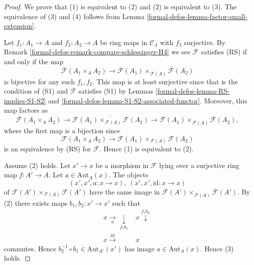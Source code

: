 \begin{proof}
We prove that (1) is equivalent to (2) and (2) is equivalent to (3).  The
equivalence of (3) and (4) follows from Lemma
\ref{formal-defos-lemma-factor-small-extension}.

\medskip\noindent
Let $f_1: A_1 \to A$ and $f_2: A_2 \to A$ be ring maps in
$\mathcal{C}_\Lambda$ with $f_2$ surjective. By
Remark \ref{formal-defos-remark-compare-schlessinger-H4}
we see $\overline{\mathcal{F}}$ satisfies (RS) if and
only if the map
$$
\overline{\mathcal{F}}(A_1 \times_A A_2) \to \overline{\mathcal
F}(A_1) \times_{\overline{\mathcal{F}}(A)} \overline{\mathcal{F}}(A_2)
$$
is bijective for any such $f_1, f_2$.
This map is at least surjective since that
is the condition of (S1) and $\overline{\mathcal{F}}$ satisfies (S1) by
Lemmas \ref{formal-defos-lemma-RS-implies-S1-S2} and
\ref{formal-defos-lemma-S1-S2-associated-functor}.
Moreover, this map factors as
$$
\overline{\mathcal{F}}(A_1 \times_A A_2)
\longrightarrow
\overline{\mathcal{F}(A_1) \times_{\mathcal{F}(A)} \mathcal{F}(A_2)}
\longrightarrow
\overline{\mathcal{F}}(A_1) \times_{\overline{\mathcal{F}}(A)}
\overline{\mathcal{F}}(A_2),
$$
where the first map is a bijection since
$$
\mathcal{F}(A_1 \times_A A_2)
\longrightarrow
\mathcal{F}(A_1) \times_{\mathcal{F}(A)} \mathcal{F}(A_2)
$$
is an equivalence by (RS) for $\mathcal{F}$. Hence (1) is equivalent to (2).

\medskip\noindent
Assume (2) holds. Let $x' \to x$ be a morphism in $\mathcal{F}$ lying
over a surjective ring map $f: A' \to A$. Let
$a \in \text{Aut}_A(x)$. The
objects
$$
(x', x', a : x \to x), \ (x', x', \text{id} : x \to x)
$$
of
$\mathcal{F}(A') \times_{\mathcal{F}(A)} \mathcal{F}(A')$
have the same image in
$\overline{\mathcal{F}}(A') \times_{\overline{\mathcal{F}}(A)}
\overline{\mathcal{F}}(A')$. By (2) there exists maps
$b_1, b_2 : x' \to x'$ such that
$$
\begin{array}{cc}x \underset{a}{\longrightarrow}\underset{f_*b_1}{\downarrow} & x \overset{f_*b_2}{\downarrow} \\ x \overset{\text{id}}{\longrightarrow} & x\end{array}
$$
commutes. Hence $b_2^{-1} \circ b_1 \in \text{Aut}_{A'}(x')$ has image
$a \in \text{Aut}_A(x)$. Hence (3) holds.


\end{proof}
